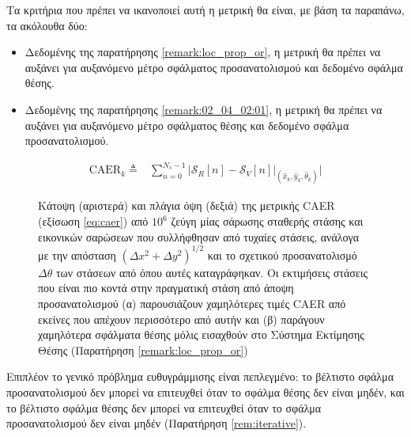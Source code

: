 Τα κριτήρια που
πρέπει να ικανοποιεί αυτή η μετρική θα είναι, με βάση τα παραπάνω, τα ακόλουθα δύο:

\begin{itemize}
  \item Δεδομένης της παρατήρησης \ref{remark:loc_prop_or}, η μετρική θα πρέπει
        να αυξάνει για αυξανόμενο μέτρο σφάλματος προσανατολισμού και δεδομένο
        σφάλμα θέσης.
  \item Δεδομένης της παρατήρησης \ref{remark:02_04_02:01}, η μετρική θα πρέπει
        να αυξάνει για αυξανόμενο μέτρο σφάλματος θέσης και δεδομένο
        σφάλμα προσανατολισμού.
\end{itemize}


\begin{align}
  \text{CAER}_k \triangleq & \sum\limits_{n=0}^{N_s-1} \Bigg| \mathcal{S}_R[n] - \mathcal{S}_V[n]\Big|_{(\hat{x}_k, \hat{y}_k, \hat{\theta}_k)} \Bigg|
  \label{eq:caer}
\end{align}



\begin{figure}[h]\centering
  
  \vspace{1cm}
  \caption{\small Κάτοψη (αριστερά) και πλάγια όψη (δεξιά) της μετρικής CAER
           (εξίσωση \ref{eq:caer}) από $10^6$ ζεύγη μίας σάρωσης σταθερής
           στάσης και εικονικών σαρώσεων που συλλήφθησαν από τυχαίες στάσεις,
           ανάλογα με την απόσταση $(\Delta x^2 + \Delta y^2)^{1/2}$ και το
           σχετικού προσανατολισμό $\Delta \theta$ των στάσεων από όπου αυτές
           καταγράφηκαν. Οι εκτιμήσεις στάσεις που είναι πιο κοντά στην
           πραγματική στάση από άποψη προσανατολισμού (α) παρουσιάζουν
           χαμηλότερες τιμές CAER από εκείνες που απέχουν περισσότερο από αυτήν
           και (β) παράγουν χαμηλότερα σφάλματα θέσης μόλις εισαχθούν στο
           Σύστημα Εκτίμησης Θέσης (Παρατήρηση \ref{remark:loc_prop_or})}
  \label{fig:02_04_04:caer}
\end{figure}




Επιπλέον το γενικό πρόβλημα ευθυγράμμισης
είναι πεπλεγμένο: το βέλτιστο σφάλμα προσανατολισμού δεν μπορεί να επιτευχθεί
όταν το σφάλμα θέσης δεν είναι μηδέν, και το βέλτιστο σφάλμα θέσης δεν μπορεί
να επιτευχθεί όταν το σφάλμα προσανατολισμού δεν είναι μηδέν (Παρατήρηση
\ref{rem:iterative}).


















